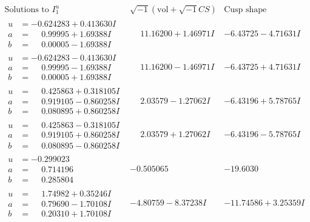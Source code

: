 \documentclass[1p]{elsarticle_modified}
\theoremstyle{definition}
\newcommand{\I}{\sqrt{-1}}
\begin{document}
$$\begin{array}{c|c|c}  
\text{Solutions to }I^u_{1}& \I (\text{vol} + \sqrt{-1}CS) & \text{Cusp shape}\\
 \hline 
\begin{aligned}
u &= -0.624283 + 0.413630 I \\
a &= \phantom{-}0.99995 + 1.69388 I \\
b &= \phantom{-}0.00005 - 1.69388 I\end{aligned}
 & \phantom{-}11.16200 + 1.46971 I & -6.43725 - 4.71631 I \\ \hline\begin{aligned}
u &= -0.624283 - 0.413630 I \\
a &= \phantom{-}0.99995 - 1.69388 I \\
b &= \phantom{-}0.00005 + 1.69388 I\end{aligned}
 & \phantom{-}11.16200 - 1.46971 I & -6.43725 + 4.71631 I \\ \hline\begin{aligned}
u &= \phantom{-}0.425863 + 0.318105 I \\
a &= \phantom{-}0.919105 - 0.860258 I \\
b &= \phantom{-}0.080895 + 0.860258 I\end{aligned}
 & \phantom{-}2.03579 - 1.27062 I & -6.43196 + 5.78765 I \\ \hline\begin{aligned}
u &= \phantom{-}0.425863 - 0.318105 I \\
a &= \phantom{-}0.919105 + 0.860258 I \\
b &= \phantom{-}0.080895 - 0.860258 I\end{aligned}
 & \phantom{-}2.03579 + 1.27062 I & -6.43196 - 5.78765 I \\ \hline\begin{aligned}
u &= -0.299023\phantom{ +0.000000I} \\
a &= \phantom{-}0.714196\phantom{ +0.000000I} \\
b &= \phantom{-}0.285804\phantom{ +0.000000I}\end{aligned}
 & -0.505065\phantom{ +0.000000I} & -19.6030\phantom{ +0.000000I} \\ \hline\begin{aligned}
u &= \phantom{-}1.74982 + 0.35246 I \\
a &= \phantom{-}0.79690 - 1.70108 I \\
b &= \phantom{-}0.20310 + 1.70108 I\end{aligned}
 & -4.80759 - 8.37238 I & -11.74586 + 3.25359 I \\ \hline\begin{aligned}

\end{aligned}
\end{array}$$
\end{document}
